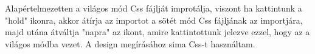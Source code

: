 Alapértelmezetten a világos mód Css fájlját improtálja, viszont ha kattintunk a "hold" ikonra, akkor átírja az importot a sötét mód Css fájljának az importjára, majd utána átváltja "napra" az ikont, amire kattintottunk jelezve ezzel, hogy az a világos módba vezet. A design megírásához sima Css-t használtam.

